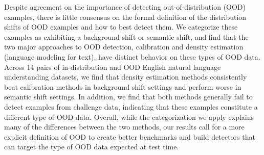 Despite agreement on the importance of detecting out-of-distribution (OOD) examples, there is little consensus on the formal definition of the distribution shifts of OOD examples and how to best detect them. We categorize these examples as exhibiting a background shift or semantic shift, and find that the two major approaches to OOD detection, calibration and density estimation (language modeling for text), have distinct behavior on these types of OOD data. Across 14 pairs of in-distribution and OOD English natural language understanding datasets, we find that density estimation methods consistently beat calibration methods in background shift settings and perform worse in semantic shift settings. In addition, we find that both methods generally fail to detect examples from challenge data, indicating that these examples constitute a different type of OOD data. Overall, while the categorization we apply explains many of the differences between the two methods, our results call for a more explicit definition of OOD to create better benchmarks and build detectors that can target the type of OOD data expected at test time.
